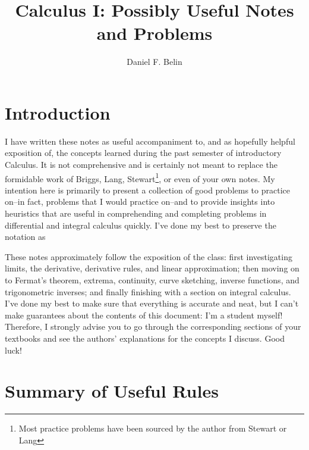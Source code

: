 \documentclass[12pt]{amsart}
\title{Calculus I: Possibly Useful Notes and Problems}
\author{Daniel F. Belin}
\begin{document}
\maketitle
\tableofcontents
\section{Introduction}
I have written these notes as useful accompaniment to, and as hopefully helpful exposition of, the concepts learned during the past semester of introductory Calculus. It is not comprehensive and is certainly not meant to replace the formidable work of Briggs, Lang, Stewart\footnote{Most practice problems have been sourced by the author from Stewart or Lang}, or even of your own notes. My intention here is primarily to present a collection of good problems to practice on--in fact, problems that I would practice on--and to provide insights into heuristics that are useful in comprehending and completing problems in differential and integral calculus quickly. I've done my best to preserve the notation as 

These notes approximately follow the exposition of the class: first investigating limits, the derivative, derivative rules, and linear approximation; then moving on to Fermat's theorem, extrema, continuity, curve sketching, inverse functions, and trigonometric inverses; and finally finishing with a section on integral calculus. I've done my best to make sure that everything is accurate and neat, but I can't make guarantees about the contents of this document: I'm a student myself! Therefore, I strongly advise you to go through the corresponding sections of your textbooks and see the authors' explanations for the concepts I discuss. Good luck!

\section{Summary of Useful Rules}
\end{document}
